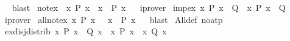 \begin{isabellebody}
\isadelimproof
\ %
\endisadelimproof
%
\isatagproof
{}\isamarkupfalse%
\ blast%
\endisatagproof
{\isafoldproof}%
%
\isadelimproof
%
\endisadelimproof
\isanewline
{}\isamarkupfalse%
\ not{\isacharunderscore}{\kern0pt}ex{\isacharcolon}{\kern0pt}\ {\isachardoublequoteopen}{\isasymnot}\ {\isacharparenleft}{\kern0pt}{\isasymexists}x{\isachardot}{\kern0pt}\ P\ x{\isacharparenright}{\kern0pt}\ {\isasymlongleftrightarrow}\ {\isacharparenleft}{\kern0pt}{\isasymforall}x{\isachardot}{\kern0pt}\ {\isasymnot}\ P\ x{\isacharparenright}{\kern0pt}{\isachardoublequoteclose}%
\isadelimproof
\ %
\endisadelimproof
%
\isatagproof
{}\isamarkupfalse%
\ iprover%
\endisatagproof
{\isafoldproof}%
%
\isadelimproof
%
\endisadelimproof
\isanewline
{}\isamarkupfalse%
\ imp{\isacharunderscore}{\kern0pt}ex{\isacharcolon}{\kern0pt}\ {\isachardoublequoteopen}{\isacharparenleft}{\kern0pt}{\isacharparenleft}{\kern0pt}{\isasymexists}x{\isachardot}{\kern0pt}\ P\ x{\isacharparenright}{\kern0pt}\ {\isasymlongrightarrow}\ Q{\isacharparenright}{\kern0pt}\ {\isasymlongleftrightarrow}\ {\isacharparenleft}{\kern0pt}{\isasymforall}x{\isachardot}{\kern0pt}\ P\ x\ {\isasymlongrightarrow}\ Q{\isacharparenright}{\kern0pt}{\isachardoublequoteclose}%
\isadelimproof
\ %
\endisadelimproof
%
\isatagproof
{}\isamarkupfalse%
\ iprover%
\endisatagproof
{\isafoldproof}%
%
\isadelimproof
%
\endisadelimproof
\isanewline
{}\isamarkupfalse%
\ all{\isacharunderscore}{\kern0pt}not{\isacharunderscore}{\kern0pt}ex{\isacharcolon}{\kern0pt}\ {\isachardoublequoteopen}{\isacharparenleft}{\kern0pt}{\isasymforall}x{\isachardot}{\kern0pt}\ P\ x{\isacharparenright}{\kern0pt}\ {\isasymlongleftrightarrow}\ {\isasymnot}\ {\isacharparenleft}{\kern0pt}{\isasymexists}x{\isachardot}{\kern0pt}\ {\isasymnot}\ P\ x{\isacharparenright}{\kern0pt}{\isachardoublequoteclose}%
\isadelimproof
\ %
\endisadelimproof
%
\isatagproof
{}\isamarkupfalse%
\ blast%
\endisatagproof
{\isafoldproof}%
%
\isadelimproof
%
\endisadelimproof
\isanewline
\isanewline
{}\isamarkupfalse%
\ All{\isacharunderscore}{\kern0pt}def\ {\isacharbrackleft}{\kern0pt}no{\isacharunderscore}{\kern0pt}atp{\isacharbrackright}{\kern0pt}\isanewline
\isanewline
{}\isamarkupfalse%
\ ex{\isacharunderscore}{\kern0pt}disj{\isacharunderscore}{\kern0pt}distrib{\isacharcolon}{\kern0pt}\ {\isachardoublequoteopen}{\isacharparenleft}{\kern0pt}{\isasymexists}x{\isachardot}{\kern0pt}\ P\ x\ {\isasymor}\ Q\ x{\isacharparenright}{\kern0pt}\ {\isasymlongleftrightarrow}\ {\isacharparenleft}{\kern0pt}{\isasymexists}x{\isachardot}{\kern0pt}\ P\ x{\isacharparenright}{\kern0pt}\ {\isasymor}\ {\isacharparenleft}{\kern0pt}{\isasymexists}x{\isachardot}{\kern0pt}\ Q\ x{\isacharparenright}{\kern0pt}{\isachardoublequoteclose}%

\end{isabellebody}
